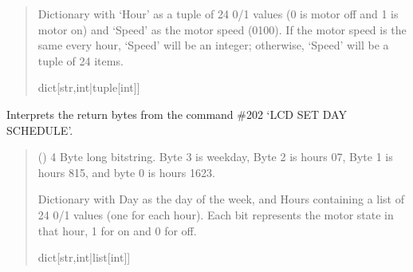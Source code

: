 \documentclass[letterpaper,10pt,english]{sphinxmanual}
\begin{document}
\begin{fulllineitems}
\begin{fulllineitems}
\begin{quote}
\begin{description}
\sphinxAtStartPar
Dictionary with ‘Hour’ as a tuple of 24 0/1 values (0 is motor off and                 1 is motor on) and ‘Speed’ as the motor speed (0\sphinxhyphen{}100). If the motor speed is the same                 every hour, ‘Speed’ will be an integer; otherwise, ‘Speed’ will be a tuple of 24 items.

\sphinxAtStartPar
dict{[}str,int|tuple{[}int{]}{]}

\end{description}\end{quote}

\end{fulllineitems}


\begin{fulllineitems}
\label{\detokenize{Morelia.Devices:Morelia.Devices.PodDevice_8229.Pod8229.DecodeLCDSchedule}}
\pysigstartsignatures
{}
\pysigstopsignatures
\sphinxAtStartPar
Interprets the return bytes from the command \#202 ‘LCD SET DAY SCHEDULE’.
\begin{quote}\begin{description}
\sphinxAtStartPar
{} () \textendash{} 4 Byte long bitstring. Byte 3 is weekday, Byte 2 is hours 0\sphinxhyphen{}7,                 Byte 1 is hours 8\sphinxhyphen{}15, and byte 0 is hours 16\sphinxhyphen{}23.

\sphinxAtStartPar
Dictionary with Day as the day of the week, and Hours                 containing a list of 24 0/1 values (one for each hour). Each bit represents the                 motor state in that hour, 1 for on and 0 for off.

\sphinxAtStartPar
dict{[}str,int|list{[}int{]}{]}

\end{description}\end{quote}


\end{fulllineitems}
\end{fulllineitems}
\end{document}
